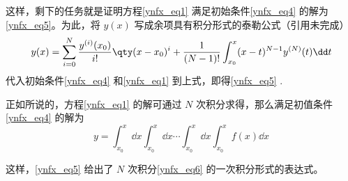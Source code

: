 这样，剩下的任务就是证明方程\autoref{ynfx_eq1} 满足初始条件\autoref{ynfx_eq4} 的解为\autoref{ynfx_eq5}。为此，将 $y(x)$ 写成余项具有积分形式的泰勒公式（引用未完成）
\begin{equation}
y(x)=\sum_{i=0}^{N}\frac{y^{(i)}(x_0)}{i!}\qty(x-x_0)^{i}+\frac{1}{(N-1)!}\int_{x_0}^{x}(x-t)^{N-1}y^{(N)}(t)\dd t
\end{equation}
代入初始条件\autoref{ynfx_eq4} 和\autoref{ynfx_eq1} 到上式，即得\autoref{ynfx_eq5} .

正如所说的，方程\autoref{ynfx_eq1} 的解可通过 $N$ 次积分求得，那么满足初值条件\autoref{ynfx_eq4} 的解为
\begin{equation}\label{ynfx_eq6}
y=\int_{x_0}^x\dd x\int_{x_0}^x\dd x\cdots\int_{x_0}^{x}\dd x\int_{x_0}^{x}f(x)\dd x
\end{equation}

这样，\autoref{ynfx_eq5} 给出了 $N$ 次积分\autoref{ynfx_eq6} 的一次积分形式的表达式。